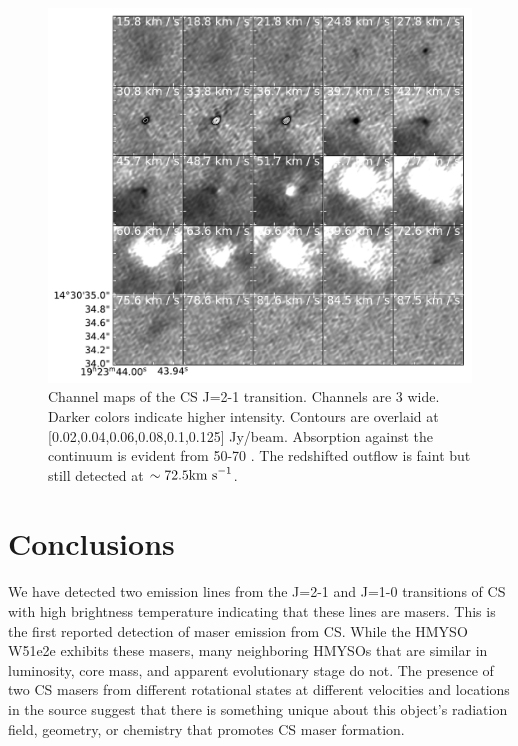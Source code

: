 \documentclass[twocolumn]{aastex62}
\begin{document}

\begin{figure}
    \includegraphics[]{figures/CS_maser_channel_maps.pdf}
    \caption{Channel maps of the CS J=2-1 transition.  Channels are 3 \kms
    wide.  Darker colors indicate higher intensity.  Contours are overlaid at
    [0.02,0.04,0.06,0.08,0.1,0.125] Jy/beam.  Absorption against the continuum
    is evident from 50-70 \kms.  The redshifted outflow is faint but still
    detected at
    $\sim72.5\textrm{km~s}^{-1}$.
    }
    \label{fig:channelmaps}
\end{figure}

\section{Conclusions}
We have detected two emission lines from the J=2-1 and J=1-0 transitions of CS
with high brightness temperature indicating that these lines are masers.
This is the first reported detection of maser emission from CS.
While the HMYSO W51e2e exhibits these masers, many neighboring HMYSOs that
are similar in luminosity, core mass, and apparent evolutionary stage
do not.  The presence of two CS masers from different rotational states
at different velocities and locations in the source suggest that there is something
unique about this object's radiation field, geometry, or chemistry that
promotes CS maser formation.
\end{document}
